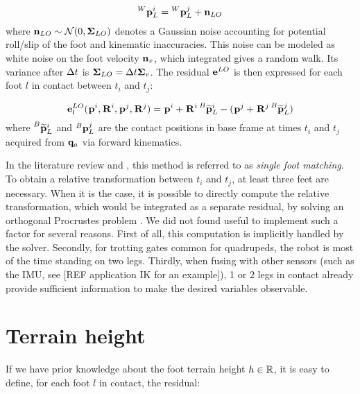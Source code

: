 \begin{equation}
    \prescript{W}{}{{\bf p}}_{L}^i = \prescript{W}{}{{\bf p}}_{L}^j + {\bf n}_{LO}
\end{equation}
%
where ${\bf n}_{LO} \sim \mathcal{N}({0},{{\bm \Sigma}_{LO}})$ denotes a Gaussian noise accounting for potential roll/slip of the foot and kinematic inaccuracies.
This noise can be modeled as white noise on the foot velocity ${\bf n}_v$, which integrated gives a random walk.  
Its variance after $\Delta t$ is ${\bm \Sigma}_{LO} = \Delta t {\bm \Sigma}_v$.
The residual ${\bf e}^{LO}$ is then expressed for each foot $l$ in contact between $t_i$ and $t_j$:

\begin{equation}
    {\bf e}^{LO}_l(\prescript{}{}{{\bf p}}_{}^i, \prescript{}{}{{\bf R}}_{}^i, \prescript{}{}{{\bf p}}_{}^j, \prescript{}{}{{\bf R}}_{}^j) = \prescript{}{}{{\bf p}}_{}^i + \prescript{}{}{{\bf R}}_{}^i \prescript{B}{}{\widetilde{{\bf p}}}_{L}^i - (\prescript{}{}{{\bf p}}_{}^j + \prescript{}{}{{\bf R}}_{}^j \prescript{B}{}{\widetilde{{\bf p}}}_{L}^j)
\end{equation}
%
where $\prescript{B}{}{\widetilde{{\bf p}}}_{L}^i$ and $\prescript{B}{}{{\bf p}}_{L}^j$ are the contact positions in base frame at times $t_i$ and $t_j$ acquired from ${\bf q}_a$ via forward kinematics. 

In the literature review and , this method is referred to as \textit{single foot matching}. To obtain
a relative transformation between $t_i$ and $t_j$, at least three feet are necessary. When it is the case, it is possible to directly compute the
relative transformation, which would be integrated as a separate residual, by solving an orthogonal Procrustes problem \cite{roston1991dead}.
We did not found useful to implement such a factor for several reasons. First of all, this computation is implicitly handled by the solver.
Secondly, for trotting gates common for quadrupeds, the robot is most of the time standing on two legs. Thirdly, when fusing with other sensors (such as the IMU,
see [REF application IK for an example]), 1 or 2 legs in contact already provide sufficient information to make the desired variables observable.



\section{Terrain height}
If we have prior knowledge about the foot terrain height $h \in \mathbb{R}$, it is easy to define, for each foot $l$ in contact, the residual:

